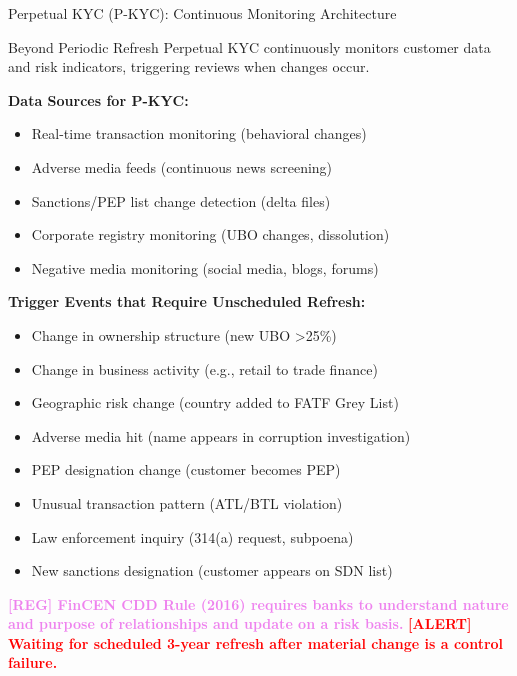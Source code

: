 \documentclass[11pt,a4paper]{beamer}
\newcommand{\redflag}[1]{\textcolor{red}{\textbf{[ALERT] #1}}}
\newcommand{\regcite}[1]{\textcolor{violet}{\textbf{[REG] #1}}}
\begin{document}
\begin{frame}{Perpetual KYC (P-KYC): Continuous Monitoring Architecture}
	\begin{block}{Beyond Periodic Refresh}
		Perpetual KYC continuously monitors customer data and risk indicators, triggering reviews when changes occur.
	\end{block}
	\textbf{Data Sources for P-KYC:}
	\begin{itemize}
		\item Real-time transaction monitoring (behavioral changes)
		\item Adverse media feeds (continuous news screening)
		\item Sanctions/PEP list change detection (delta files)
		\item Corporate registry monitoring (UBO changes, dissolution)
		\item Negative media monitoring (social media, blogs, forums)
	\end{itemize}
	\textbf{Trigger Events that Require Unscheduled Refresh:}
	\begin{itemize}
		\item Change in ownership structure (new UBO >25\%)
		\item Change in business activity (e.g., retail to trade finance)
		\item Geographic risk change (country added to FATF Grey List)
		\item Adverse media hit (name appears in corruption investigation)
		\item PEP designation change (customer becomes PEP)
		\item Unusual transaction pattern (ATL/BTL violation)
		\item Law enforcement inquiry (314(a) request, subpoena)
		\item New sanctions designation (customer appears on SDN list)
	\end{itemize}
	\regcite{FinCEN CDD Rule (2016) requires banks to understand nature and purpose of relationships and update on a risk basis.}
	\redflag{Waiting for scheduled 3-year refresh after material change is a control failure.}
\end{frame}
\end{document}

